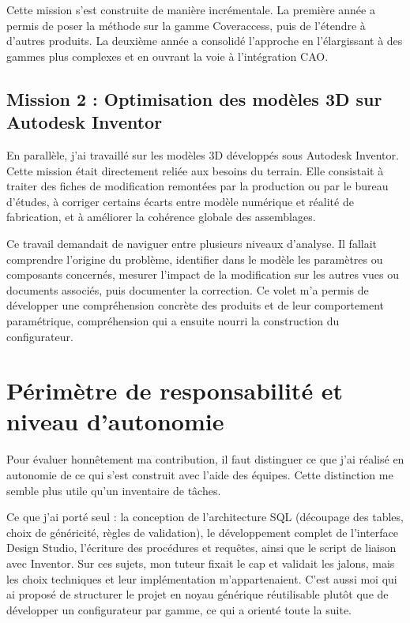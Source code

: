 Cette mission s'est construite de manière incrémentale. La première année a permis de poser la méthode sur la gamme Coveraccess, puis de l'étendre à d'autres produits. La deuxième année a consolidé l'approche en l'élargissant à des gammes plus complexes et en ouvrant la voie à l'intégration CAO.

\subsection{Mission 2 : Optimisation des modèles 3D sur Autodesk Inventor}

En parallèle, j'ai travaillé sur les modèles 3D développés sous Autodesk Inventor. Cette mission était directement reliée aux besoins du terrain. Elle consistait à traiter des fiches de modification remontées par la production ou par le bureau d'études, à corriger certains écarts entre modèle numérique et réalité de fabrication, et à améliorer la cohérence globale des assemblages.

Ce travail demandait de naviguer entre plusieurs niveaux d'analyse. Il fallait comprendre l'origine du problème, identifier dans le modèle les paramètres ou composants concernés, mesurer l'impact de la modification sur les autres vues ou documents associés, puis documenter la correction. Ce volet m'a permis de développer une compréhension concrète des produits et de leur comportement paramétrique, compréhension qui a ensuite nourri la construction du configurateur.

\section{Périmètre de responsabilité et niveau d'autonomie}

Pour évaluer honnêtement ma contribution, il faut distinguer ce que j'ai réalisé en autonomie de ce qui s'est construit avec l'aide des équipes. Cette distinction me semble plus utile qu'un inventaire de tâches.

Ce que j'ai porté seul : la conception de l'architecture SQL (découpage des tables, choix de généricité, règles de validation), le développement complet de l'interface Design Studio, l'écriture des procédures et requêtes, ainsi que le script de liaison avec Inventor. Sur ces sujets, mon tuteur fixait le cap et validait les jalons, mais les choix techniques et leur implémentation m'appartenaient. C'est aussi moi qui ai proposé de structurer le projet en noyau générique réutilisable plutôt que de développer un configurateur par gamme, ce qui a orienté toute la suite.

